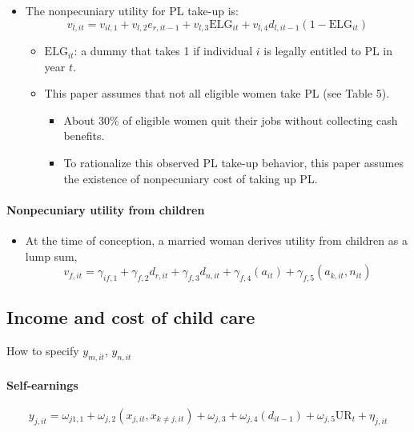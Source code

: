 \documentclass[../root]{subfiles}
\begin{document}
    \begin{itemize}
      \item The nonpecuniary utility for PL take-up is:
      \[
      v_{l, it} = v_{il, 1} + v_{l, 2} e_{r, it-1} + v_{l, 3} \text{ELG}_{it} + v_{l, 4} d_{l, it-1} (1 - \text{ELG}_{it})
      \]
      \begin{itemize}
        \item $\text{ELG}_{it}$: a dummy that takes 1 if individual $i$ is legally entitled to PL in year $t$.
        \item This paper assumes that not all eligible women take PL (see Table 5).
        \begin{itemize}
          \item About 30\% of eligible women quit their jobs without collecting cash benefits.
          \item To rationalize this observed PL take-up behavior, this paper assumes the existence of nonpecuniary cost of taking up PL.
        \end{itemize}
      \end{itemize}
    \end{itemize}

    \paragraph{Nonpecuniary utility from children}

    \begin{itemize}
      \item At the time of conception, a married woman derives utility from children as a lump sum,
      \[
      v_{f, it} = \gamma_{if, 1} + \gamma_{f, 2} d_{r, it} + \gamma_{f, 3} d_{n, it} + \gamma_{f, 4} (a_{it}) + \gamma_{f, 5}(a_{k, it}, n_{it})
      \]
    \end{itemize}



    \subsection{Income and cost of child care}

    How to specify $y_{m, it}$, $y_{n, it}$

    \paragraph{Self-earnings}

    \[
    y_{j, it} = \omega_{j1, 1} + \omega_{j, 2} (x_{j, it}, x_{k \neq j, it}) + \omega_{j, 3} + \omega_{j, 4} (d_{it-1}) + \omega_{j, 5}\text{UR}_t + \eta_{j, it}
    \]
\end{document}
